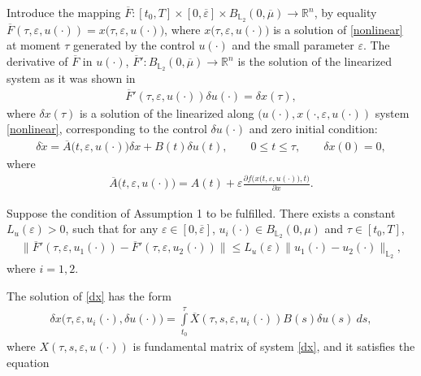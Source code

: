 \documentclass[../main.tex]{subfiles}
\begin{document}
Introduce the mapping $\overline{F}: [t_0,T] \times [0,\overline{\varepsilon}] \times B_{\mathbb{L}_2}(0,\overline{\mu}) \to \mathbb{R}^n$, by equality $\overline{F}(\tau,\varepsilon, u(\cdot)) = x \big(\tau,\varepsilon, u(\cdot)\big) $, where $x \big(\tau,\varepsilon, u(\cdot)\big)$ is a solution of \eqref{nonlinear} at moment $\tau$ generated by the control $u(\cdot)$ and the small parameter $\varepsilon$.  The derivative of $\overline{F}$ in $u(\cdot)$, $\overline{F}': B_{\mathbb{L}_2}(0,\overline{\mu}) \to \mathbb{R}^n $ is the solution of the linearized system as it was shown in \cite{GusZyk}
\begin{gather}\label{dF}
	\overline{F}'(\tau,\varepsilon, u(\cdot)) \delta u(\cdot) = \delta x(\tau), 
\end{gather}
where $\delta x(\tau)$ is a solution of the linearized along $(u(\cdot),x(\cdot,\varepsilon, u(\cdot))$ system \eqref{nonlinear}, corresponding to the control $\delta u(\cdot)$ and zero initial condition:
\begin{gather}\label{dx}
	\delta\dot{x} =   \overline{A}\big(t,\varepsilon,u(\cdot)\big) \delta x +  B(t)\delta u(t), \qquad 0\leqslant t \leqslant \tau, \qquad \delta x(0) = 0,
\end{gather}
where
\begin{gather*}
	\overline{A}\big(t,\varepsilon,u(\cdot)\big) = A(t) +\varepsilon \frac{\partial f\big(x(t,\varepsilon,u(\cdot)\big),t\big)}{\partial x}.
\end{gather*}
\begin{lemma}\label{lem:Lipdx}
	Suppose the condition of Assumption 1 to be fulfilled. There exists a constant $L_u(\varepsilon) > 0$, such that for any $\varepsilon\in [0,\overline{\varepsilon}]$, $u_i(\cdot) \in B_{\mathbb{L}_2}(0,\mu)$ and $\tau \in [t_0,T]$, 
	\begin{gather*}
		\| \overline{F}'(\tau,\varepsilon, u_1(\cdot)) - \overline{F}'(\tau,\varepsilon, u_2(\cdot)) \| \leqslant L_u(\varepsilon) \| u_1(\cdot) - u_2(\cdot) \|_{\mathbb{L}_2},
	\end{gather*}
	where $i = 1,2$.
\end{lemma}
\doc
The solution of \eqref{dx} has the form
\begin{gather}\label{xu}
	\delta x\big(\tau,\varepsilon,u_i(\cdot),\delta u(\cdot)\big) = \int\limits_{t_0}^{\tau}  \overline{X}(\tau,s,\varepsilon,u_i(\cdot)) B(s) \delta u(s) \ ds,
\end{gather}
where $X(\tau,s,\varepsilon,u(\cdot)) $ is fundamental matrix of system \eqref{dx}, and it satisfies the equation
\end{document}
